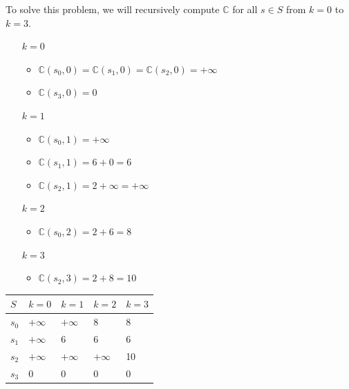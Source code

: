 \begin{example}
To solve this problem, we will recursively compute $\mathbb{C}$ for all $s \in S$ from $k=0$ to $k=3$.\\[0.7em]
\begin{minipage}{0.5\linewidth}
    \begin{itemize}
      \item[$k=0$] \begin{itemize}
[label=\raisebox{0.25ex}{\tiny$\bullet$}]        \item $\mathbb{C}(s_0, 0) = \mathbb{C}(s_1, 0) = \mathbb{C}(s_2, 0) = +\infty$
        \item $\mathbb{C}(s_3, 0) = 0$
      \end{itemize}
      \item[$k=1$]
        \begin{itemize}
[label=\raisebox{0.25ex}{\tiny$\bullet$}]          \item $\mathbb{C}(s_0, 1) = +\infty$
          \item $\mathbb{C}(s_1, 1) = 6 + 0 = 6$
          \item $\mathbb{C}(s_2, 1) = 2 + \infty = +\infty$
        \end{itemize}
      \item[$k=2$]
        \begin{itemize}
[label=\raisebox{0.25ex}{\tiny$\bullet$}]          \item $\mathbb{C}(s_0, 2) = 2 + 6 = 8$
        \end{itemize}
      \item[$k=3$]
        \begin{itemize}
[label=\raisebox{0.25ex}{\tiny$\bullet$}]          \item $\mathbb{C}(s_2, 3) = 2 + 8 = 10$
        \end{itemize}
    \end{itemize}
\end{minipage}
\begin{minipage}{0.5\linewidth}
\centering
\begin{tabular}{l|llll}
$S$ & $k=0$     & $k=1$     & $k=2$     & $k=3$ \\ \hline
$s_0$  & $+\infty$ & $+\infty$ & 8         & 8     \\
$s_1$  & $+\infty$ & 6         & 6         & 6     \\
$s_2$  & $+\infty$ & $+\infty$ & $+\infty$ & 10    \\
$s_3$  & 0         & 0         & 0         & 0
\end{tabular}
\captionsetup{justification=centering}

\end{minipage}
\end{example}
